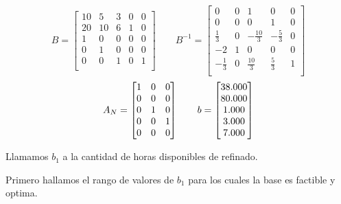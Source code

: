 \documentclass[10pt,a4paper]{article}
\begin{document}
\begin{enumerate}[label=\textbf{\sffamily\large\arabic*.}]
    \[
    B = \begin{bmatrix}
    10 & 5  & 3 & 0 & 0 \\
    20 & 10 & 6 & 1 & 0 \\
    1  & 0  & 0 & 0 & 0 \\
    0  & 1  & 0 & 0 & 0 \\
    0  & 0  & 1 & 0 & 1 \\
    \end{bmatrix}
    \hspace{2em}
    B^{-1} = \begin{bmatrix}
        0           & 0 &    1	        &   0            &	0 \\
        0           & 0 &    0	        &   1            &	0 \\
      \frac{1}{3}   & 0 & -\frac{10}{3} & -\frac{5}{3}   &	0 \\
       -2           & 1 &    0	        &   0            &	0 \\
       -\frac{1}{3} & 0 & \frac{10}{3}	& \frac{5}{3}    &	1 \\
    \end{bmatrix}
    \]
    \vspace{1em}
    \[
        A_N = \begin{bmatrix}
        1 & 0 & 0 \\
        0 & 0 & 0 \\
        0 & 1 & 0 \\
        0 & 0 & 1 \\
        0 & 0 & 0 \\
        \end{bmatrix}
        \hspace{2em}
        b = \begin{bmatrix}
            $38.000$ \\
            $80.000$ \\
            $1.000$  \\
            $3.000$  \\
            $7.000$  \\
        \end{bmatrix}
    \]

    \vspace{1em}

Llamamos $b_1$ a la cantidad de horas disponibles de refinado.

\vspace{0,5em}

Primero hallamos el rango de valores de $b_1$ para los cuales la base es factible y optima. \\
    


\end{enumerate}
\end{document}
